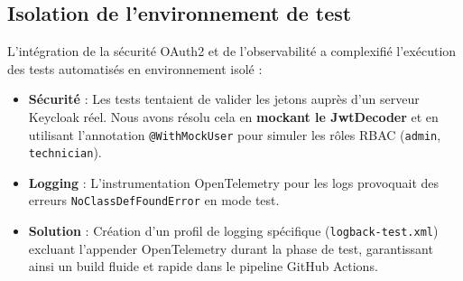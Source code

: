 \documentclass[12pt,a4paper]{article}
\begin{document}
\subsection{Isolation de l'environnement de test}
L'intégration de la sécurité OAuth2 et de l'observabilité a complexifié l'exécution des tests automatisés en environnement isolé :
\begin{itemize}
    \item \textbf{Sécurité} : Les tests tentaient de valider les jetons auprès d'un serveur Keycloak réel. Nous avons résolu cela en \textbf{mockant le JwtDecoder} et en utilisant l'annotation \texttt{@WithMockUser} pour simuler les rôles RBAC (\texttt{admin}, \texttt{technician}).
    \item \textbf{Logging} : L'instrumentation OpenTelemetry pour les logs provoquait des erreurs \texttt{NoClassDefFoundError} en mode test.
    \item \textbf{Solution} : Création d'un profil de logging spécifique (\texttt{logback-test.xml}) excluant l'appender OpenTelemetry durant la phase de test, garantissant ainsi un build fluide et rapide dans le pipeline GitHub Actions.
\end{itemize}
\end{document}
